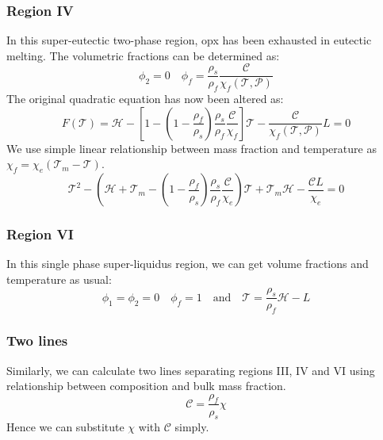 \subsubsection{Region IV}
In this super-eutectic two-phase region, opx has been exhausted in eutectic melting.
The volumetric fractions can be determined as:
\begin{equation}
\phi_2 = 0 \quad \phi_f = \frac{\rho_s}{\rho_f}\frac{\mathcal{C}}{\chi_f(\mathcal{T}, \mathcal{P})}
\end{equation}
The original quadratic equation has now been altered as:
\begin{equation}
F(\mathcal{T}) = \mathcal{H} - [1-(1-\frac{\rho_f}{\rho_s})\frac{\rho_s}{\rho_f}\frac{\mathcal{C}}{\chi_f}]\mathcal{T} - \frac{\mathcal{C}}{\chi_f(\mathcal{T}, \mathcal{P})} L = 0 
\end{equation}
We use simple linear relationship between mass fraction and temperature as 
$\chi_f = \chi_e(\mathcal{T}_m-\mathcal{T})$.
\begin{equation}
\mathcal{T}^2 - (\mathcal{H} + \mathcal{T}_m - 
(1-\frac{\rho_f}{\rho_s})\frac{\rho_s}{\rho_f}\frac{\mathcal{C}}{\chi_e})\mathcal{T}
+\mathcal{T}_m \mathcal{H} - \frac{\mathcal{C} L}{\chi_e} = 0
\end{equation}

\subsubsection{Region VI}
In this single phase  super-liquidus region, we can get volume fractions and temperature as usual:
\begin{equation}
		  \phi_1 = \phi_2 = 0 \quad \phi_f = 1 \quad \text{and} \quad \mathcal{T} = \frac{\rho_s}{\rho_f}\mathcal{H} - L
\end{equation}

\subsubsection{Two lines}
Similarly, we can calculate two lines separating regions III, IV and VI using relationship between composition and bulk 
mass fraction.
\begin{equation}
		  \mathcal{C} = \frac{\rho_f}{\rho_s} \chi
\end{equation}
Hence we can substitute $\chi$ with $\mathcal{C}$ simply.
